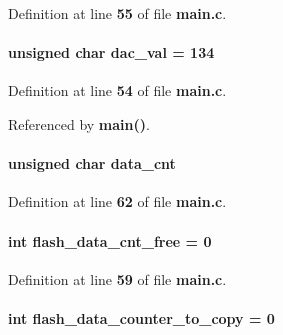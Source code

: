 Definition at line {\bf 55} of file {\bf main.\+c}.

\paragraph[{dac\+\_\+val}]{\setlength{\rightskip}{0pt plus 5cm}unsigned char dac\+\_\+val = 134}\label{main_8c_ae682bd806ef9ef41dbbe334d7ba0b617}


Definition at line {\bf 54} of file {\bf main.\+c}.



Referenced by {\bf main()}.

\paragraph[{data\+\_\+cnt}]{\setlength{\rightskip}{0pt plus 5cm}unsigned char data\+\_\+cnt}\label{main_8c_a2384b171c0e16ded907576dc11038582}


Definition at line {\bf 62} of file {\bf main.\+c}.

\paragraph[{flash\+\_\+data\+\_\+cnt\+\_\+free}]{\setlength{\rightskip}{0pt plus 5cm}int flash\+\_\+data\+\_\+cnt\+\_\+free = 0}\label{main_8c_a8c0d8c20fc3f6dadadb2e99b713deba4}


Definition at line {\bf 59} of file {\bf main.\+c}.

\paragraph[{flash\+\_\+data\+\_\+counter\+\_\+to\+\_\+copy}]{\setlength{\rightskip}{0pt plus 5cm}int flash\+\_\+data\+\_\+counter\+\_\+to\+\_\+copy = 0}\label{main_8c_ad48bbffff9389ce1cf66d6879ae99676}


